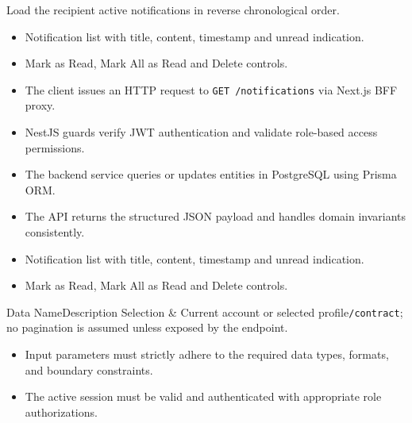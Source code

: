 \noindent Load the recipient active notifications in reverse chronological order.

\begin{itemize}[leftmargin=1.6em,topsep=3pt,itemsep=2pt,parsep=0pt,label=$\bullet$]
    \item Notification list with title, content, timestamp and unread indication.
    \item Mark as Read, Mark All as Read and Delete controls.
\end{itemize}

\begin{itemize}[leftmargin=1.6em,topsep=3pt,itemsep=2pt,parsep=0pt,label=$\bullet$]
    \item The client issues an HTTP request to \texttt{GET /\allowbreak{}notifications} via Next.js BFF proxy.
    \item NestJS guards verify JWT authentication and validate role-based access permissions.
    \item The backend service queries or updates entities in PostgreSQL using Prisma ORM.
    \item The API returns the structured JSON payload and handles domain invariants consistently.
\end{itemize}

\begin{itemize}[leftmargin=1.6em,topsep=3pt,itemsep=2pt,parsep=0pt,label=$\bullet$]
    \item Notification list with title, content, timestamp and unread indication.
    \item Mark as Read, Mark All as Read and Delete controls.
\end{itemize}


\begin{specdatatable}{Data Name}{Description}
Selection & Current account or selected profile\texttt{/\allowbreak{}contract}; no pagination is assumed unless exposed by the endpoint.\\ \hline
\end{specdatatable}

\begin{itemize}[leftmargin=1.6em,topsep=3pt,itemsep=2pt,parsep=0pt,label=$\bullet$]
    \item Input parameters must strictly adhere to the required data types, formats, and boundary constraints.
    \item The active session must be valid and authenticated with appropriate role authorizations.
\end{itemize}

